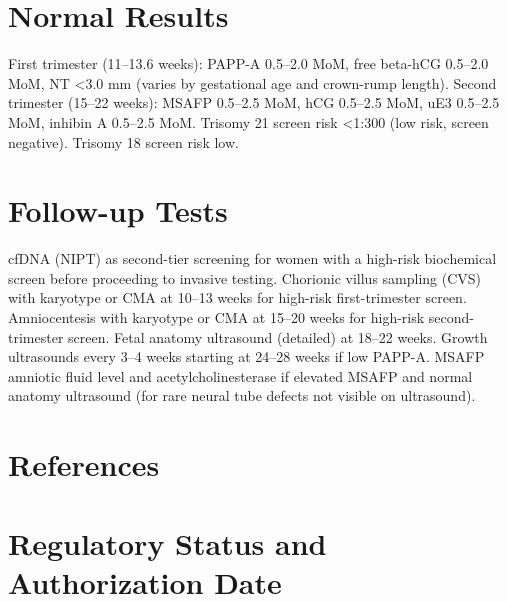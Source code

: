 \section*{Normal Results}
First trimester (11--13.6 weeks): PAPP-A 0.5--2.0 MoM, free beta-hCG 0.5--2.0 MoM, NT <3.0 mm (varies by gestational age and crown-rump length). Second trimester (15--22 weeks): MSAFP 0.5--2.5 MoM, hCG 0.5--2.5 MoM, uE3 0.5--2.5 MoM, inhibin A 0.5--2.5 MoM. Trisomy 21 screen risk <1:300 (low risk, screen negative). Trisomy 18 screen risk low.

\section*{Follow-up Tests}
cfDNA (NIPT) as second-tier screening for women with a high-risk biochemical screen before proceeding to invasive testing. Chorionic villus sampling (CVS) with karyotype or CMA at 10--13 weeks for high-risk first-trimester screen. Amniocentesis with karyotype or CMA at 15--20 weeks for high-risk second-trimester screen. Fetal anatomy ultrasound (detailed) at 18--22 weeks. Growth ultrasounds every 3--4 weeks starting at 24--28 weeks if low PAPP-A. MSAFP amniotic fluid level and acetylcholinesterase if elevated MSAFP and normal anatomy ultrasound (for rare neural tube defects not visible on ultrasound).

\section*{References}



\clearpage
\section*{Regulatory Status and Authorization Date}

\clearpage
